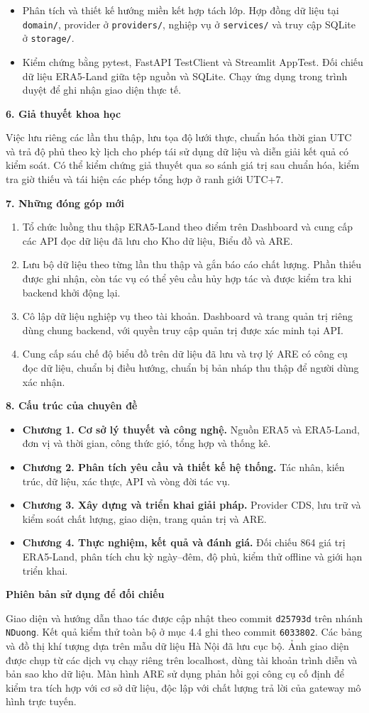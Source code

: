 \documentclass[12pt,a4paper]{article}
\newcommand{\orig}[1]{}
\newcommand{\pg}[1]{\newpage\pagenumbering{arabic}\setcounter{page}{#1}\thispagestyle{fancy}}
\newcommand{\heading}[1]{\par\medskip\noindent\textbf{#1}\par\nopagebreak}
\newcommand{\code}[1]{\texttt{#1}}
\begin{document}
\orig{12-14}
\pg{4}
\begin{itemize}
\item Phân tích và thiết kế hướng miền kết hợp tách lớp. Hợp đồng dữ liệu tại \code{domain/}, provider ở \code{providers/}, nghiệp vụ ở \code{services/} và truy cập SQLite ở \code{storage/}.
\item Kiểm chứng bằng pytest, FastAPI TestClient và Streamlit AppTest. Đối chiếu dữ liệu ERA5-Land giữa tệp nguồn và SQLite. Chạy ứng dụng trong trình duyệt để ghi nhận giao diện thực tế.
\end{itemize}
\heading{6. Giả thuyết khoa học}
Việc lưu riêng các lần thu thập, lưu tọa độ lưới thực, chuẩn hóa thời gian UTC và trả độ phủ theo kỳ lịch cho phép tái sử dụng dữ liệu và diễn giải kết quả có kiểm soát. Có thể kiểm chứng giả thuyết qua so sánh giá trị sau chuẩn hóa, kiểm tra giờ thiếu và tái hiện các phép tổng hợp ở ranh giới UTC+7.
\heading{7. Những đóng góp mới}
\begin{enumerate}
\item Tổ chức luồng thu thập ERA5-Land theo điểm trên Dashboard và cung cấp các API đọc dữ liệu đã lưu cho Kho dữ liệu, Biểu đồ và ARE.
\item Lưu bộ dữ liệu theo từng lần thu thập và gắn báo cáo chất lượng. Phần thiếu được ghi nhận, còn tác vụ có thể yêu cầu hủy hợp tác và được kiểm tra khi backend khởi động lại.
\item Cô lập dữ liệu nghiệp vụ theo tài khoản. Dashboard và trang quản trị riêng dùng chung backend, với quyền truy cập quản trị được xác minh tại API.
\item Cung cấp sáu chế độ biểu đồ trên dữ liệu đã lưu và trợ lý ARE có công cụ đọc dữ liệu, chuẩn bị điều hướng, chuẩn bị bản nháp thu thập để người dùng xác nhận.
\end{enumerate}
\pg{5}
\heading{8. Cấu trúc của chuyên đề}
\begin{itemize}
\item \textbf{Chương 1. Cơ sở lý thuyết và công nghệ.} Nguồn ERA5 và ERA5-Land, đơn vị và thời gian, công thức gió, tổng hợp và thống kê.
\item \textbf{Chương 2. Phân tích yêu cầu và thiết kế hệ thống.} Tác nhân, kiến trúc, dữ liệu, xác thực, API và vòng đời tác vụ.
\item \textbf{Chương 3. Xây dựng và triển khai giải pháp.} Provider CDS, lưu trữ và kiểm soát chất lượng, giao diện, trang quản trị và ARE.
\item \textbf{Chương 4. Thực nghiệm, kết quả và đánh giá.} Đối chiếu 864 giá trị ERA5-Land, phân tích chu kỳ ngày–đêm, độ phủ, kiểm thử offline và giới hạn triển khai.
\end{itemize}
\heading{Phiên bản sử dụng để đối chiếu}
Giao diện và hướng dẫn thao tác được cập nhật theo commit \code{d25793d} trên nhánh \code{NDuong}. Kết quả kiểm thử toàn bộ ở mục 4.4 ghi theo commit \code{6033802}. Các bảng và đồ thị khí tượng dựa trên mẫu dữ liệu Hà Nội đã lưu cục bộ. Ảnh giao diện được chụp từ các dịch vụ chạy riêng trên localhost, dùng tài khoản trình diễn và bản sao kho dữ liệu. Màn hình ARE sử dụng phản hồi gọi công cụ cố định để kiểm tra tích hợp với cơ sở dữ liệu, độc lập với chất lượng trả lời của gateway mô hình trực tuyến.
\end{document}
